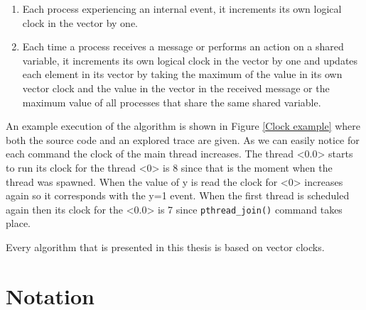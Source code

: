 \begin{enumerate}
    \item Each process experiencing an internal event, it increments its own logical clock in the vector by one.
    \item Each time a process receives a message or performs an action on a shared variable, it increments its own logical clock in the vector by one and updates each element in its vector 
    by taking the maximum of the value in its own vector clock and the value in the vector in the received message or the maximum value of all processes that share
    the same shared variable.
\end{enumerate}

An example execution of the algorithm is shown in Figure \ref{Clock example} where both the source code and an explored trace are given.
As we can easily notice for each command the clock of the main thread increases. The thread <0.0> starts to run its clock for the thread <0> is 8 since 
that is the moment when the thread was spawned. When the value of y is read the clock for <0> increases again so it corresponds with the y=1 event. When the first thread is
scheduled again then its clock for the <0.0> is 7 since \verb|pthread_join()| command takes place.



Every algorithm that is presented in this thesis is based on vector clocks.


\section{Notation}

